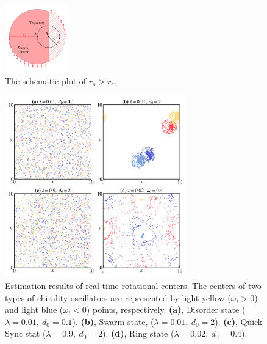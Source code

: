 \documentclass[%
 aip,
 amsmath,amssymb,
 reprint,%
]{revtex4-1}
\begin{document}
\begin{figure}
    \includegraphics[width=0.25\textwidth]{./figs/rsProofEps.pdf}
    \caption{
        \label{fig:rsProofEps} The schematic plot of $r_s>r_c$.
    }
\end{figure}

\begin{figure}
    \includegraphics[width=0.7\textwidth]{./figs/etimateCenter.png}
    \caption{
        \label{fig:etimateCenter} Estimation results of real-time rotational centers. 
        The centers of two types of chirality oscillators are represented by light yellow ($\omega_i > 0$) and light blue
        ($\omega_i < 0$) points, respectively.
        \textbf{(a)}, Disorder state ($\lambda=0.01,\ d_0=0.1$).
        \textbf{(b)}, Swarm state, ($\lambda=0.01,\ d_0=2$).
        \textbf{(c)}, Quick Sync stat ($\lambda=0.9,\ d_0=2$).
        \textbf{(d)}, Ring state ($\lambda=0.02,\ d_0=0.4$).
    }
\end{figure}

$$
$$
$$
$$
\hrulefill
\nocite{*}

\end{document}
